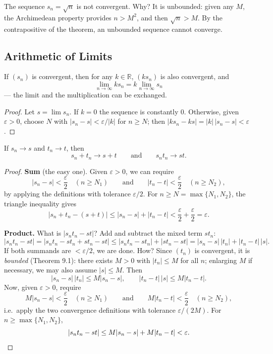 \documentclass[11pt]{report}
\begin{document}
\begin{exbox}
The sequence $s_n = \sqrt{n}$ is not convergent. Why? It is unbounded: given any $M$, the Archimedean property provides $n > M^2$, and then $\sqrt{n} > M$. By the contrapositive of the theorem, an unbounded sequence cannot converge.
\end{exbox}

\subsection{Arithmetic of Limits}

\begin{thmbox}
If $(s_n)$ is convergent, then for any $k \in \mathbb{R}$, $(k s_n)$ is also convergent, and
\[
\lim_{n\to\infty} k s_n = k \lim_{n\to\infty} s_n
\]
--- the limit and the multiplication can be exchanged.
\end{thmbox}

\begin{proof}
Let $s = \lim s_n$. If $k = 0$ the sequence is constantly $0$. Otherwise, given $\varepsilon > 0$, choose $N$ with $|s_n - s| < \varepsilon / |k|$ for $n \geq N$; then $|k s_n - k s| = |k| \, |s_n - s| < \varepsilon$.
\end{proof}

\begin{thmbox}
If $s_n \to s$ and $t_n \to t$, then
\[
s_n + t_n \to s + t \qquad \text{and} \qquad s_n t_n \to s t.
\]
\end{thmbox}

\begin{proof}
\textbf{Sum} (the easy one). Given $\varepsilon > 0$, we can require
\[
|s_n - s| < \frac\varepsilon2 \quad (n \geq N_1) \qquad \text{and} \qquad |t_n - t| < \frac\varepsilon2 \quad (n \geq N_2),
\]
by applying the definitions with tolerance $\varepsilon/2$. For $n \geq N = \max\{N_1, N_2\}$, the triangle inequality gives
\[
|s_n + t_n - (s + t)| \leq |s_n - s| + |t_n - t| < \frac\varepsilon2 + \frac\varepsilon2 = \varepsilon.
\]

\textbf{Product.} What is $|s_n t_n - st|$? Add and subtract the mixed term $s t_n$:
\[
|s_n t_n - s t| = |s_n t_n - s t_n + s t_n - s t|
\leq |s_n t_n - s t_n| + |s t_n - s t|
= |s_n - s|\,|t_n| + |t_n - t|\,|s|.
\]
If both summands are $< \varepsilon/2$, we are done. How? Since $(t_n)$ is convergent, it is \emph{bounded} (Theorem 9.1): there exists $M > 0$ with $|t_n| \leq M$ for all $n$; enlarging $M$ if necessary, we may also assume $|s| \leq M$. Then
\[
|s_n - s|\,|t_n| \leq M |s_n - s|, \qquad |t_n - t|\,|s| \leq M |t_n - t|.
\]
Now, given $\varepsilon > 0$, require
\[
M |s_n - s| < \frac\varepsilon2 \quad (n \geq N_1) \qquad \text{and} \qquad M |t_n - t| < \frac\varepsilon2 \quad (n \geq N_2),
\]
i.e.\ apply the two convergence definitions with tolerance $\varepsilon / (2M)$. For $n \geq \max\{N_1, N_2\}$,
\[
|s_n t_n - st| \leq M|s_n - s| + M|t_n - t| < \varepsilon. \qedhere
\]
\end{proof}
\end{document}
